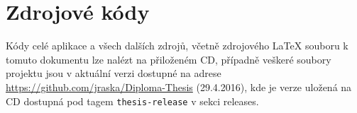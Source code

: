 \documentclass[czech,master,public,dept460,male,java,cpdeclaration]{diploma}
\begin{document}
  \appendix

  \section{Zdrojové kódy}
  Kódy celé aplikace a všech dalších zdrojů, včetně zdrojového \mbox{\LaTeX}
  souboru k tomuto dokumentu
   lze nalézt na přiloženém CD, případně veškeré soubory
  projektu jsou v aktuální verzi dostupné na adrese \url{https://github.com/jraska/Diploma-Thesis} (29.4.2016),
  kde je verze uložená na CD dostupná pod tagem \texttt{thesis-release} v sekci releases.
\end{document}
